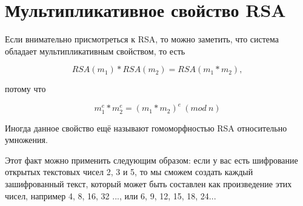 \documentclass[12pt,a4paper]{scrartcl}
\begin{document}
\section{Мультипликативное свойство RSA}

Если внимательно присмотреться к RSA, то можно заметить, что система обладает  мультипликативным свойством, то есть

$$RSA(m_1)*RSA(m_2)=RSA(m_1*m_2),$$

потому что 

$$m_1^e*m_2^e = (m_1*m_2)^e\ (mod\ n)$$

Иногда данное свойство ещё называют гомоморфностью RSA относительно умножения.

Этот факт можно применить следующим образом: если у вас есть шифрование открытых текстовых чисел 2, 3 и 5, то мы сможем создать каждый зашифрованный текст, который может быть составлен как произведение этих чисел, например 4, 8, 16, 32 ..., или 6, 9, 12, 15, 18, 24... 
\end{document}
